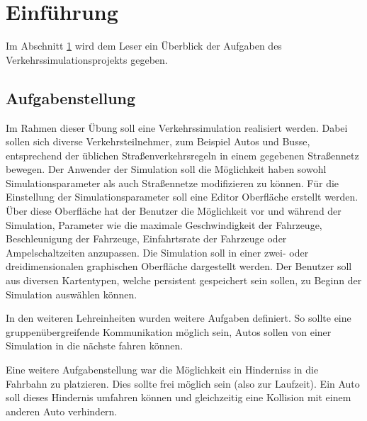 
\chapter{Einführung}
\label{Einführung}

Im Abschnitt \ref{Einführung} wird dem Leser ein Überblick der Aufgaben des Verkehrssimulationsprojekts gegeben.

\thispagestyle{standard}
\pagestyle{standard}

\section{Aufgabenstellung}
\label{Aufgabenstellung}

Im Rahmen dieser Übung soll eine Verkehrssimulation realisiert werden. Dabei sollen sich diverse Verkehrsteilnehmer, zum Beispiel Autos und Busse, entsprechend der üblichen Straßenverkehrsregeln in einem gegebenen Straßennetz bewegen. Der Anwender der Simulation soll die Möglichkeit haben sowohl Simulationsparameter als auch Straßennetze modifizieren zu können. Für die Einstellung der Simulationsparameter soll eine Editor Oberfläche erstellt werden. Über diese Oberfläche hat der Benutzer die Möglichkeit vor und während der Simulation, Parameter wie die maximale Geschwindigkeit der Fahrzeuge, Beschleunigung der Fahrzeuge, Einfahrtsrate der Fahrzeuge oder Ampelschaltzeiten anzupassen. Die Simulation soll in einer zwei- oder dreidimensionalen graphischen Oberfläche dargestellt werden. Der Benutzer soll aus diversen Kartentypen, welche persistent gespeichert sein sollen, zu Beginn der Simulation auswählen können. 

In den weiteren Lehreinheiten wurden weitere Aufgaben definiert. So sollte eine gruppenübergreifende Kommunikation möglich sein, Autos sollen von einer Simulation in die nächste fahren können.

Eine weitere Aufgabenstellung war die Möglichkeit ein  Hinderniss in die Fahrbahn zu platzieren. Dies sollte frei möglich sein (also zur Laufzeit). Ein Auto soll dieses Hindernis umfahren können und gleichzeitig eine Kollision mit einem anderen Auto verhindern.

